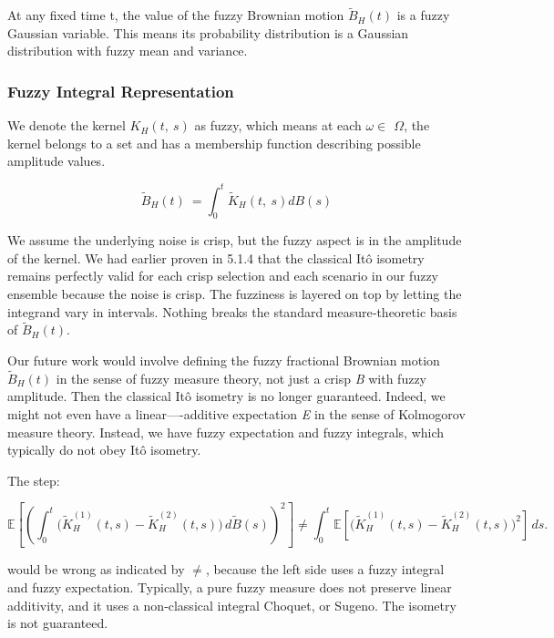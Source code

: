 \documentclass[12pt,a4paper]{report}
\numberwithin{equation}{section}
\begin{document}
At any fixed time t, the value of the fuzzy Brownian motion
\({\widetilde{B}}_{H}(t)\) is a fuzzy Gaussian variable. This means its
probability distribution is a Gaussian distribution with fuzzy mean and
variance.

\hypertarget{fuzzy--integral--representation}{%
\subsubsection{\texorpdfstring{ Fuzzy Integral
Representation}{ Fuzzy Integral Representation}}\label{fuzzy--integral--representation}}

We denote the kernel \(K_{H}(t,\ s)\) as fuzzy, which means at each
\emph{$\omega$$\in$ $\Omega$}, the kernel belongs to a set and has a membership function
describing possible amplitude values.

\[{\widetilde{B}}_{H}(t)\  = \int_{0}^{t}{{\widetilde{K}}_{H}(t,\ s)dB(s)}\]

We assume the underlying noise is crisp, but the fuzzy aspect is in the
amplitude of the kernel. We had earlier proven in 5.1.4 that the
classical Itô isometry remains perfectly valid for each crisp selection
and each scenario in our fuzzy ensemble because the noise is crisp. The
fuzziness is layered on top by letting the integrand vary in intervals.
Nothing breaks the standard measure‐theoretic basis of
\({\widetilde{B}}_{H}(t)\).

Our future work would involve defining the fuzzy fractional Brownian
motion \({\widetilde{B}}_{H}(t)\) in the sense of fuzzy measure theory,
not just a crisp \emph{B} with fuzzy amplitude. Then the classical Itô
isometry is no longer guaranteed. Indeed, we might not even have a
linear----additive expectation \emph{E} in the sense of Kolmogorov measure
theory. Instead, we have fuzzy expectation and fuzzy integrals, which
typically do not obey Itô isometry.

The step:

\[
\mathbb{E}\!\left[\left(\int_{0}^{t}\Big(\widetilde{K}_{H}^{(1)}(t,s)-\widetilde{K}_{H}^{(2)}(t,s)\Big)\,d\widetilde{B}(s)\right)^{2}\right]
\neq
\int_{0}^{t}\mathbb{E}\!\left[\Big(\widetilde{K}_{H}^{(1)}(t,s)-\widetilde{K}_{H}^{(2)}(t,s)\Big)^{2}\right]\,ds .
\]


would be wrong as indicated by $\neq$, because the left side uses a fuzzy
integral and fuzzy expectation. Typically, a pure fuzzy measure does not
preserve linear additivity, and it uses a non‐classical integral
Choquet, or Sugeno. The isometry is not guaranteed.
\end{document}
